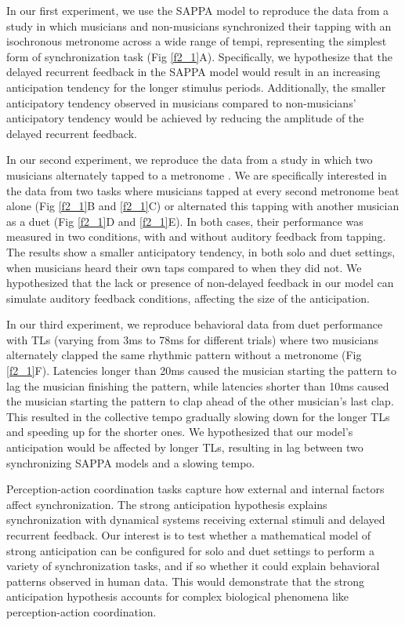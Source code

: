 \documentclass{report}
\begin{document}
In our first experiment, we use the SAPPA model to reproduce the data from a study in which musicians and non-musicians synchronized their tapping with an isochronous metronome across a wide range of tempi, representing the simplest form of synchronization task \cite{repp2007tapping} (Fig \ref{f2_1}A). Specifically, we hypothesize that the delayed recurrent feedback in the SAPPA model would result in an increasing anticipation tendency for the longer stimulus periods. Additionally, the smaller anticipatory tendency observed in musicians compared to non-musicians' anticipatory tendency would be achieved by reducing the amplitude of the delayed recurrent feedback.

In our second experiment, we reproduce the data from a study in which two musicians alternately tapped to a metronome \cite{nowicki2013mutual}. We are specifically interested in the data from two tasks where musicians tapped at every second metronome beat alone (Fig \ref{f2_1}B and \ref{f2_1}C) or alternated this tapping with another musician as a duet (Fig \ref{f2_1}D and \ref{f2_1}E). In both cases, their performance was measured in two conditions, with and without auditory feedback from tapping. The results show a smaller anticipatory tendency, in both solo and duet settings, when musicians heard their own taps compared to when they did not. We hypothesized that the lack or presence of non-delayed feedback in our model can simulate auditory feedback conditions, affecting the size of the anticipation.

In our third experiment, we reproduce behavioral data from duet performance with TLs (varying from 3ms to 78ms for different trials) where two musicians alternately clapped the same rhythmic pattern without a metronome \cite{chafe2010effect} (Fig \ref{f2_1}F). Latencies longer than 20ms caused the musician starting the pattern to lag the musician finishing the pattern, while latencies shorter than 10ms caused the musician starting the pattern to clap ahead of the other musician's last clap. This resulted in the collective tempo gradually slowing down for the longer TLs and speeding up for the shorter ones. We hypothesized that our model's anticipation would be affected by longer TLs, resulting in lag between two synchronizing SAPPA models and a slowing tempo.

Perception-action coordination tasks capture how external and internal factors affect synchronization. The strong anticipation hypothesis explains synchronization with dynamical systems receiving external stimuli and delayed recurrent feedback. Our interest is to test whether a mathematical model of strong anticipation can be configured for solo and duet settings to perform a variety of synchronization tasks, and if so whether it could explain behavioral patterns observed in human data. This would demonstrate that the strong anticipation hypothesis accounts for complex biological phenomena like perception-action coordination.
\end{document}
